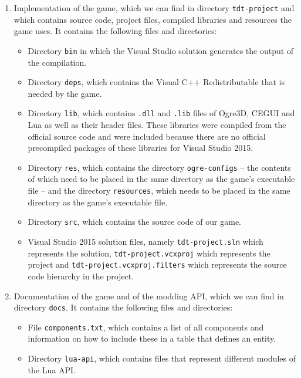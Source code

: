 \documentclass[12pt,a4paper]{report}
\begin{document}
\begin{enumerate}[label=\textbf{\Alph*.}]
    \item Implementation of the game, which we can find in directory \texttt{tdt-project} and which contains source code, project files,
        compiled libraries and resources the game uses. It contains the following files and directories:
        \begin{itemize}
            \item Directory \texttt{bin} in which the Visual Studio solution generates the output of the compilation.
            \item Directory \texttt{deps}, which contains the Visual C++ Redistributable that is needed by the game.
            \item Directory \texttt{lib}, which contains \texttt{.dll} and \texttt{.lib} files of Ogre3D, CEGUI and Lua as well as their
                header files. These libraries were compiled from the official source code and were  included because there are no official
                precompiled packages of these libraries for Visual Studio 2015.
            \item Directory \texttt{res}, which contains the directory \texttt{ogre-configs} -- the contents of which need to be placed
                in the same directory as the game's executable file -- and the directory \texttt{resources}, which needs to be placed
                in the same directory as the game's executable file.
            \item Directory \texttt{src}, which contains the source code of our game.
            \item Visual Studio 2015 solution files, namely \texttt{tdt-project.sln} which represents the solution,
                \texttt{tdt-project.vcxproj} which represents the project and \texttt{tdt-project.vcxproj.filters} which represents
                the source code hierarchy in the project.
        \end{itemize}
    \item Documentation of the game and of the modding API, which we can find in directory \texttt{docs}. It contains the following files
        and directories:
        \begin{itemize}
            \item File \texttt{components.txt}, which contains a list of all components and information on how to include these
                in a table that defines an entity.
            \item Directory \texttt{lua-api}, which contains files that represent different modules of the Lua API.

\end{itemize}
\end{enumerate}
\end{document}
